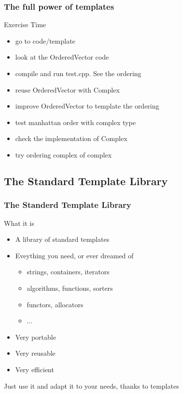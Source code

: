 \begin{frame}[fragile]
  \frametitle{The full power of templates}
  \begin{alertblock}{Exercise Time}
    \begin{itemize}
    \item go to code/template
    \item look at the OrderedVector code
    \item compile and run test.cpp. See the ordering
    \item reuse OrderedVector with Complex
    \item improve OrderedVector to template the ordering
    \item test manhattan order with complex type
    \item check the implementation of Complex
    \item try ordering complex of complex
    \end{itemize}
  \end{alertblock}
\end{frame}

\fi  %

\subsection[STL]{The Standard Template Library}

\begin{frame}[fragile]
  \frametitle{The Standerd Template Library}
  \begin{block}{What it is}
    \begin{itemize}
    \item A library of standard templates
    \item Eveything you need, or ever dreamed of
      \begin{itemize}
      \item strings, containers, iterators
      \item algorithms, functions, sorters
      \item functors, allocators
      \item ...
      \end{itemize}
    \item Very portable
    \item Very reusable
    \item Very efficient
    \end{itemize}
  \end{block}
  \pause
  \begin{alertblock}{Just use it}
    and adapt it to your needs, thanks to templates
  \end{alertblock}
\end{frame}

